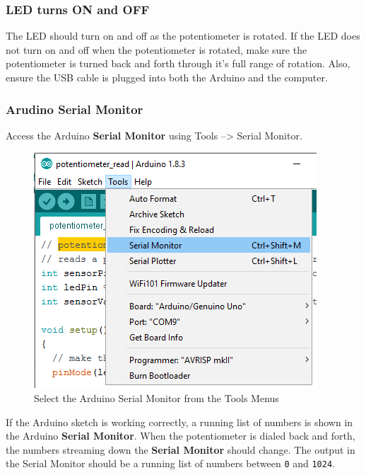 \documentclass{book}
\makeatletter
\def\maxwidth{\ifdim\Gin@nat@width>\linewidth\linewidth
    \else\Gin@nat@width\fi}
\let\Oldincludegraphics\includegraphics
\renewcommand{\includegraphics}[1]{\Oldincludegraphics[width=.8\maxwidth]{#1}}
\makeatother
\begin{document}
    
        \subsubsection{LED turns ON and OFF}\label{led-turns-on-and-off}

The LED should turn on and off as the potentiometer is rotated. If the
LED does not turn on and off when the potentiometer is rotated, make
sure the potentiometer is turned back and forth through it's full range
of rotation. Also, ensure the USB cable is plugged into both the Arduino
and the computer.
    




    
        \subsubsection{Arudino Serial Monitor}\label{arudino-serial-monitor}

Access the Arduino \textbf{Serial Monitor} using Tools --\textgreater{}
Serial Monitor.

\begin{figure}
\centering
\includegraphics{images/Tools_SerialMonitor.png}
\caption{Select the Arduino Serial Monitor from the Tools Menus}
\end{figure}
    




    
        If the Arduino sketch is working correctly, a running list of numbers is
shown in the Arduino \textbf{Serial Monitor}. When the potentiometer is
dialed back and forth, the numbers streaming down the \textbf{Serial
Monitor} should change. The output in the Serial Monitor should be a
running list of numbers between \lstinline!0! and \lstinline!1024!.
\end{document}
